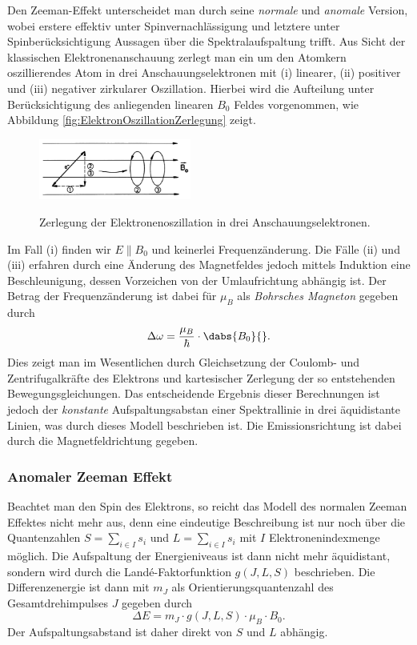 Den Zeeman-Effekt unterscheidet man durch seine \emph{normale} und \emph{anomale} Version, wobei erstere effektiv unter Spinvernachlässigung und letztere unter Spinberücksichtigung Aussagen über die Spektralaufspaltung trifft. Aus Sicht der klassischen Elektronenanschauung zerlegt man ein um den Atomkern oszillierendes Atom in drei Anschauungselektronen mit (i) linearer, (ii) positiver und (iii) negativer zirkularer Oszillation. Hierbei wird die Aufteilung unter Berücksichtigung des anliegenden linearen $B_0$ Feldes vorgenommen, wie Abbildung \ref{fig:ElektronOszillationZerlegung} zeigt. 
\begin{figure}[H]
	\centering
	\includegraphics[width=5cm]{../../Bilddateien/Grundlagen/ElektronOszillationZerlegung.png}
	\label{fig:ElektronenOszillationZerlegung}
	\caption{Zerlegung der Elektronenoszillation in drei Anschauungselektronen.}
\end{figure}
Im Fall (i) finden wir $E\parallel B_0$ und keinerlei Frequenzänderung. Die Fälle (ii) und (iii) erfahren durch eine Änderung des Magnetfeldes jedoch mittels Induktion eine Beschleunigung, dessen Vorzeichen von der Umlaufrichtung abhängig ist. Der Betrag der Frequenzänderung ist dabei für $\mu_B$ als \emph{Bohrsches Magneton} gegeben durch 
\[
	\Delta\omega = \frac{\mu_B}{\hbar}\cdot\dabs{B_0}{}.
\]
Dies zeigt man im Wesentlichen durch Gleichsetzung der Coulomb- und Zentrifugalkräfte des Elektrons und kartesischer Zerlegung der so entstehenden Bewegungsgleichungen. Das entscheidende Ergebnis dieser Berechnungen ist jedoch der \emph{konstante} Aufspaltungsabstan einer Spektrallinie in drei äquidistante Linien, was durch dieses Modell beschrieben ist. Die Emissionsrichtung ist dabei durch die Magnetfeldrichtung gegeben. 

\subsubsection*{Anomaler Zeeman Effekt}
	Beachtet man den Spin des Elektrons, so reicht das Modell des normalen Zeeman Effektes nicht mehr aus, denn eine eindeutige Beschreibung ist nur noch über die Quantenzahlen $S = \sum_{i\in I}s_i$ und $L = \sum_{i\in I}s_i$ mit $I$ Elektronenindexmenge möglich. Die Aufspaltung der Energieniveaus ist dann nicht mehr äquidistant, sondern wird durch die Landé-Faktorfunktion $g(J,L,S)$ beschrieben. Die Differenzenergie ist dann mit $m_J$ als Orientierungsquantenzahl des Gesamtdrehimpulses $J$ gegeben durch
	\[
		\Delta E = m_J\cdot g(J,L,S)\cdot\mu_B\cdot B_0.
	\]
	Der Aufspaltungsabstand ist daher direkt von $S$ und $L$ abhängig. \cite{}
